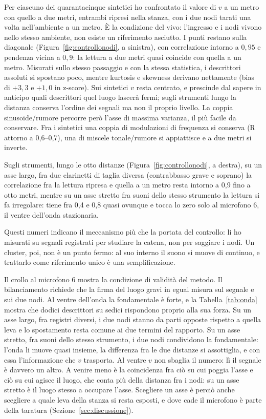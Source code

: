 \documentclass{article}
\begin{document}
 Per ciascuno dei quarantacinque sintetici ho confrontato il valore di $v$ a un metro con quello a due metri, entrambi ripresi nella stanza, con i due nodi tarati una volta nell'ambiente a un metro. È la condizione del vivo: l'ingresso e i nodi vivono nello stesso ambiente, non esiste un riferimento asciutto. I punti restano sulla diagonale (Figura~\ref{fig:controllonodi}, a sinistra), con correlazione intorno a $0{,}95$ e pendenza vicina a $0{,}9$: la lettura a due metri quasi coincide con quella a un metro. Misurati sullo stesso passaggio e con la stessa statistica, i descrittori assoluti si spostano poco, mentre kurtosis e skewness derivano nettamente (bias di $+3{,}3$ e $+1{,}0$ in z-score). Sui sintetici $v$ resta centrato, e prescinde dal sapere in anticipo quali descrittori quel luogo lascerà fermi; sugli strumenti lungo la distanza conserva l'ordine dei segnali ma non il proprio livello. La coppia sinusoide/rumore percorre però l'asse di massima varianza, il più facile da conservare. Fra i sintetici una coppia di modulazioni di frequenza si conserva (R attorno a 0,6--0,7), una di miscele tonale/rumore si appiattisce e a due metri si inverte.

Sugli strumenti, lungo le otto distanze (Figura~\ref{fig:controllonodi}, a destra), su un asse largo, fra due clarinetti di taglia diversa (contrabbasso grave e soprano) la correlazione fra la lettura ripresa e quella a un metro resta intorno a 0,9 fino a otto metri, mentre su un asse stretto fra suoni dello stesso strumento la lettura si fa irregolare: tiene fra 0,4 e 0,8 quasi ovunque e tocca lo zero solo al microfono 6, il ventre dell'onda stazionaria.

Questi numeri indicano il meccanismo più che la portata del controllo: li ho misurati su segnali registrati per studiare la catena, non per saggiare i nodi. Un cluster, poi, non è un punto fermo: al suo interno il suono si muove di continuo, e trattarlo come riferimento unico è una semplificazione.

Il crollo al microfono 6 mostra la condizione di validità del metodo. Il bilanciamento richiede che la firma del luogo gravi in egual misura sul segnale e sui due nodi. Al ventre dell'onda la fondamentale è forte, e la Tabella~\ref{tab:onda} mostra che dodici descrittori su sedici rispondono proprio alla sua forza. Su un asse largo, fra registri diversi, i due nodi stanno da parti opposte rispetto a quella leva e lo spostamento resta comune ai due termini del rapporto. Su un asse stretto, fra suoni dello stesso strumento, i due nodi condividono la fondamentale: l'onda li muove quasi insieme, la differenza fra le due distanze si assottiglia, e con essa l'informazione che $v$ trasporta. Al ventre $v$ non sbaglia il numero: lì il segnale è davvero un altro. A venire meno è la coincidenza fra ciò su cui poggia l'asse e ciò su cui agisce il luogo, che conta più della distanza fra i nodi: su un asse stretto è il luogo stesso a occupare l'asse. Scegliere un asse è perciò anche scegliere a quale leva della stanza si resta esposti, e dove cade il microfono è parte della taratura (Sezione~\ref{sec:discussione}).
\end{document}
